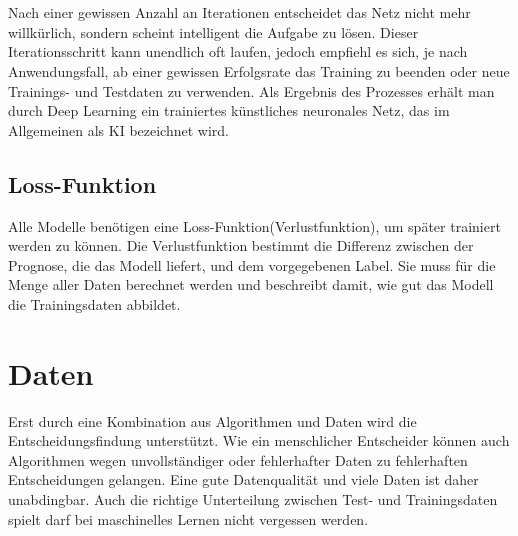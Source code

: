 \documentclass[12pt,oneside,a4paper,parskip]{scrbook}
\begin{document}
\\\\
Nach einer gewissen Anzahl an Iterationen entscheidet das Netz nicht mehr willkürlich, sondern scheint intelligent die Aufgabe zu lösen. Dieser Iterationsschritt kann unendlich oft laufen, jedoch empfiehl es sich, je nach Anwendungsfall, ab einer gewissen Erfolgsrate das Training zu beenden oder neue Trainings- und Testdaten zu verwenden. Als Ergebnis des Prozesses erhält man durch Deep Learning ein trainiertes künstliches neuronales Netz, das im Allgemeinen als KI bezeichnet wird.

\subsection{Loss-Funktion}
\label{section:lossFunction}

Alle Modelle benötigen eine Loss-Funktion(Verlustfunktion), um später trainiert werden zu können. Die Verlustfunktion bestimmt die Differenz zwischen der Prognose, die das Modell liefert, und dem vorgegebenen Label. Sie muss für die Menge aller Daten berechnet werden und beschreibt damit, wie gut das Modell die Trainingsdaten abbildet.

\section{Daten}
\label{section:Data}
Erst durch eine Kombination aus Algorithmen und Daten wird die Entscheidungsfindung unterstützt. Wie ein menschlicher Entscheider können auch Algorithmen wegen unvollständiger oder fehlerhafter Daten zu fehlerhaften Entscheidungen gelangen. Eine gute Datenqualität und viele Daten ist daher unabdingbar. Auch die richtige Unterteilung zwischen Test- und Trainingsdaten spielt darf bei maschinelles Lernen nicht vergessen werden.
\end{document}
